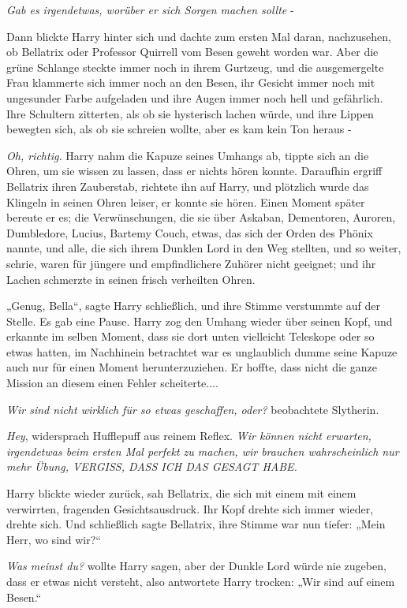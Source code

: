 {\emph{Gab es irgendetwas, worüber er sich Sorgen machen sollte} -

Dann blickte Harry hinter sich und dachte zum ersten Mal daran, nachzusehen, ob Bellatrix oder Professor Quirrell vom Besen geweht worden war. Aber die grüne Schlange steckte immer noch in ihrem Gurtzeug, und die ausgemergelte Frau klammerte sich immer noch an den Besen, ihr Gesicht immer noch mit ungesunder Farbe aufgeladen und ihre Augen immer noch hell und gefährlich. Ihre Schultern zitterten, als ob sie hysterisch lachen würde, und ihre Lippen bewegten sich, als ob sie schreien wollte, aber es kam kein Ton heraus -

\emph{Oh, richtig.} Harry nahm die Kapuze seines Umhangs ab, tippte sich an die Ohren, um sie wissen zu lassen, dass er nichts hören konnte. Daraufhin ergriff Bellatrix ihren Zauberstab, richtete ihn auf Harry, und plötzlich wurde das Klingeln in seinen Ohren leiser, er konnte sie hören. Einen Moment später bereute er es; die Verwünschungen, die sie über Askaban, Dementoren, Auroren, Dumbledore, Lucius, Bartemy Couch, etwas, das sich der Orden des Phönix nannte, und alle, die sich ihrem Dunklen Lord in den Weg stellten, und so weiter, schrie, waren für jüngere und empfindlichere Zuhörer nicht geeignet; und ihr Lachen schmerzte in seinen frisch verheilten Ohren.

„Genug, Bella“, sagte Harry schließlich, und ihre Stimme verstummte auf der Stelle. Es gab eine Pause. Harry zog den Umhang wieder über seinen Kopf, und erkannte im selben Moment, dass sie dort unten vielleicht Teleskope oder so etwas hatten, im Nachhinein betrachtet war es unglaublich dumme seine Kapuze auch nur für einen Moment herunterzuziehen. Er hoffte, dass nicht die ganze Mission an diesem einen Fehler scheiterte....

\emph{Wir sind nicht wirklich für so etwas geschaffen, oder?} beobachtete Slytherin.

\emph{Hey}, widersprach Hufflepuff aus reinem Reflex. \emph{Wir können nicht erwarten, irgendetwas beim ersten Mal perfekt zu machen, wir brauchen wahrscheinlich nur mehr Übung, VERGISS, DASS ICH DAS GESAGT HABE.}

Harry blickte wieder zurück, sah Bellatrix, die sich mit einem mit einem verwirrten, fragenden Gesichtsausdruck. Ihr Kopf drehte sich immer wieder, drehte sich. Und schließlich sagte Bellatrix, ihre Stimme war nun tiefer: „Mein Herr, wo sind wir?“

\emph{Was meinst du?} wollte Harry sagen, aber der Dunkle Lord würde nie zugeben, dass er etwas nicht versteht, also antwortete Harry trocken: „Wir sind auf einem Besen.“

}
